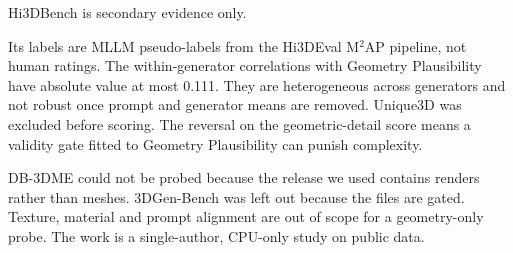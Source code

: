Hi3DBench is secondary evidence only.

Its labels are MLLM pseudo-labels from the Hi3DEval M$^{2}$AP pipeline, not human ratings.
The within-generator correlations with Geometry Plausibility have absolute value at most 0.111.
They are heterogeneous across generators and not robust once prompt and generator means are removed.
Unique3D was excluded before scoring.
The reversal on the geometric-detail score means a validity gate fitted to Geometry Plausibility can punish complexity.

DB-3DME could not be probed because the release we used contains renders rather than meshes.
3DGen-Bench was left out because the files are gated.
Texture, material and prompt alignment are out of scope for a geometry-only probe.
The work is a single-author, CPU-only study on public data.

